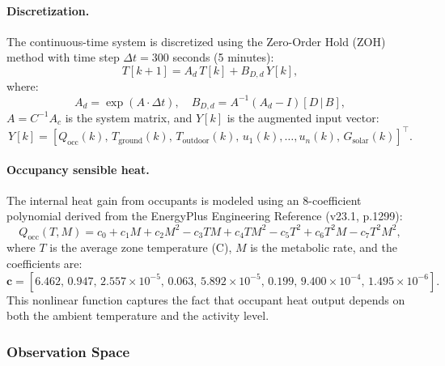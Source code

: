 \paragraph{Discretization.} The continuous-time system is discretized using the Zero-Order Hold (ZOH) method with time step $\Delta t = 300$ seconds (5 minutes):
\begin{equation}
    T[k+1] = A_d \, T[k] + B_{D,d} \, Y[k],
    \label{eq:building_dynamics}
\end{equation}
where:
\begin{equation}
    A_d = \exp(A \cdot \Delta t), \quad B_{D,d} = A^{-1}(A_d - I)[D \,|\, B],
    \label{eq:building_discretization}
\end{equation}
$A = C^{-1} A_c$ is the system matrix, and $Y[k]$ is the augmented input vector:
\begin{equation}
    Y[k] = [Q_{\text{occ}}(k), \, T_{\text{ground}}(k), \, T_{\text{outdoor}}(k), \, u_1(k), \ldots, u_n(k), \, G_{\text{solar}}(k)]^\top.
    \label{eq:building_input}
\end{equation}

\paragraph{Occupancy sensible heat.} The internal heat gain from occupants is modeled using an 8-coefficient polynomial derived from the EnergyPlus Engineering Reference (v23.1, p.1299):
\begin{equation}
    Q_{\text{occ}}(T, M) = c_0 + c_1 M + c_2 M^2 - c_3 T M + c_4 T M^2 - c_5 T^2 + c_6 T^2 M - c_7 T^2 M^2,
    \label{eq:occupancy}
\end{equation}
where $T$ is the average zone temperature (\degree C), $M$ is the metabolic rate, and the coefficients are:
\begin{equation}
    \mathbf{c} = [6.462, \, 0.947, \, 2.557{\times}10^{-5}, \, 0.063, \, 5.892{\times}10^{-5}, \, 0.199, \, 9.400{\times}10^{-4}, \, 1.495{\times}10^{-6}].
\end{equation}
This nonlinear function captures the fact that occupant heat output depends on both the ambient temperature and the activity level.


\subsubsection{Observation Space}

